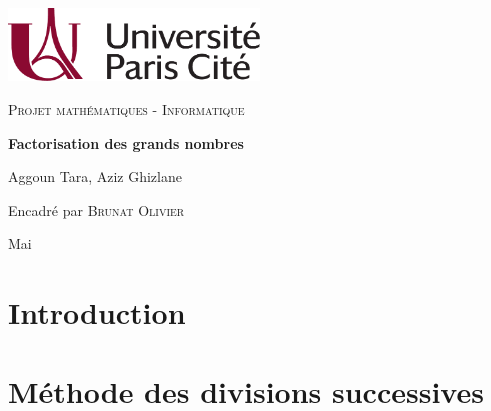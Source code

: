 \documentclass[a4paper]{report}
\theoremstyle{plain}
\theoremstyle{definition}
\begin{document}

    \begin{center}
    
        \includegraphics[width=0.5\textwidth]{media/logo_upc.pdf}
        \vfill
        {\Large \textsc{Projet mathématiques - Informatique}\par}
        \vspace{1.5cm}
        {\huge\bfseries Factorisation des grands nombres\par}
        \vspace{2cm}
        {\Large Aggoun Tara, Aziz Ghizlane\par}
        Encadré par \textsc{Brunat Olivier}
        \vfill
        {\large Mai \the\year \par}
        \vspace{2cm}

    \end{center}
    
    \tableofcontents
    \newpage


    \chapter*{Introduction}
    

    \chapter{Méthode des divisions successives}
    


\end{document}
